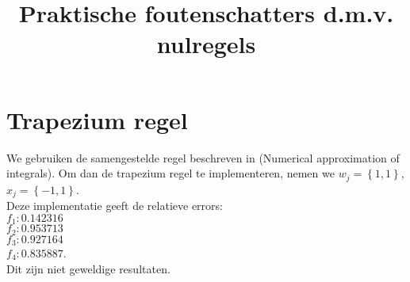 \documentclass{article}
\title{Praktische foutenschatters d.m.v. nulregels}
\author{}
\date{}
\begin{document}
\maketitle

\section{Trapezium regel}
We gebruiken de samengestelde regel beschreven in (Numerical approximation of integrals). Om dan de trapezium regel te implementeren, nemen we $w_j = \left\{1, 1\right\}$, $x_j = \left\{-1, 1\right\}$. \\

Deze implementatie geeft de relatieve errors: \\
$f_1: 0.142316$ \\
$f_2: 0.953713$ \\
$f_3: 0.927164$ \\
$f_4: 0.835887$. \\

Dit zijn niet geweldige resultaten.
\end{document}

